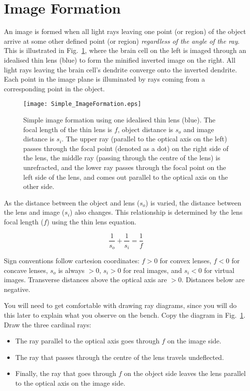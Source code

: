 \documentclass[a4paper]{report}
\begin{document}
	
	\clearpage
	
	\section{Image Formation}
	An image is formed when all light rays leaving one point (or region) of the object arrive at some other defined point (or region) \textit{regardless of the angle of the ray}. 
	This is illustrated in Fig.~\ref{fig:imageforming}, where the brain cell on the left is imaged through an idealised thin lens (blue) to form the minified inverted image on the right. 
	All light rays leaving the brain cell's dendrite converge onto the inverted dendrite. 
	Each point in the image plane is illuminated by rays coming from a corresponding point in the object. 
	
	
	
	\begin{figure}[h]
		\center
		\texttt{[image: Simple\_ImageFormation.eps]}
		\caption{Simple image formation using one idealised thin lens (blue). 
			The focal length of the thin lens is $f$, object distance is $s_o$ and image distance is $s_i$. 
			The upper ray (parallel to the optical axis on the left) passes through the focal point (denoted as a dot) on the right side of the lens, the middle ray (passing through the centre of the lens) is unrefracted, and the lower ray passes through the focal point on the left side of the lens, and comes out parallel to the optical axis on the other side. 
		}
		\label{fig:imageforming}
	\end{figure}
	
	As the distance between the object and lens ($s_o$) is varied, the distance between the lens and image ($s_i$) also changes. This relationship is determined by the lens focal length ($f$) using the thin lens equation.
	
	\begin{equation}
	\frac{1}{s_o} + \frac{1}{s_i} = \frac{1}{f}
	\label{eq:thinlens}
	\end{equation}
	
	Sign conventions follow cartesion coordinates: $f>0$ for convex lenses, $f<0$ for concave lenses, $s_o$ is always $>0$, $s_i>0$ for real images, and $s_i<0$ for virtual images.
	Transverse distances above the optical axis are $>0$. Distances below are negative. 
	
	\vspace{2.5em}
	You will need to get comfortable with drawing ray diagrams, since you will do this later to explain what you observe on the bench.
	Copy the diagram in Fig.~\ref{fig:imageforming}.
	Draw the three cardinal rays:
	\begin{itemize}
		\item The ray parallel to the optical axis goes through $f$ on the image side.
		\item The ray that passes through the centre of the lens travels undeflected.
		\item Finally, the ray that goes through $f$ on the object side leaves the lens parallel to the optical axis on the image side. 
	\end{itemize}
	
\end{document}
